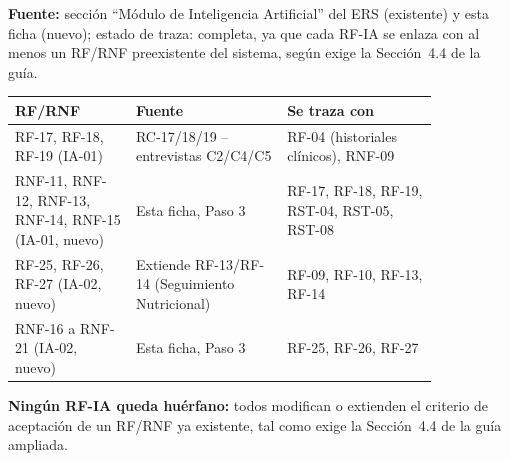 \textbf{Fuente:} sección ``Módulo de Inteligencia Artificial'' del ERS (existente) y esta ficha (nuevo); estado de traza: completa, ya que cada RF-IA se enlaza con al menos un RF/RNF preexistente del sistema, según exige la Sección~4.4 de la guía.

\begin{longtable}{@{}>{\raggedright\arraybackslash}p{0.24\linewidth} >{\raggedright\arraybackslash}p{0.30\linewidth} >{\raggedright\arraybackslash}p{0.30\linewidth}@{}}
\toprule
\textbf{RF/RNF} & \textbf{Fuente} & \textbf{Se traza con} \\
\midrule
\endhead
\bottomrule
\endlastfoot

RF-17, RF-18, RF-19 (IA-01) & RC-17/18/19 -- entrevistas C2/C4/C5 & RF-04 (historiales clínicos), RNF-09 \\[4pt]
RNF-11, RNF-12, RNF-13, RNF-14, RNF-15 (IA-01, nuevo) & Esta ficha, Paso 3 & RF-17, RF-18, RF-19, RST-04, RST-05, RST-08 \\[4pt]
RF-25, RF-26, RF-27 (IA-02, nuevo) & Extiende RF-13/RF-14 (Seguimiento Nutricional) & RF-09, RF-10, RF-13, RF-14 \\[4pt]
RNF-16 a RNF-21 (IA-02, nuevo) & Esta ficha, Paso 3 & RF-25, RF-26, RF-27 \\

\end{longtable}

\textbf{Ningún RF-IA queda huérfano:} todos modifican o extienden el criterio de aceptación de un RF/RNF ya existente, tal como exige la Sección~4.4 de la guía ampliada.
